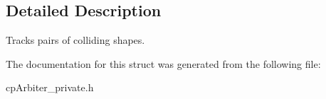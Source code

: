 \subsection{Detailed Description}
Tracks pairs of colliding shapes. 

The documentation for this struct was generated from the following file\+:\begin{DoxyCompactItemize}
\item 
cp\+Arbiter\+\_\+private.\+h\end{DoxyCompactItemize}
